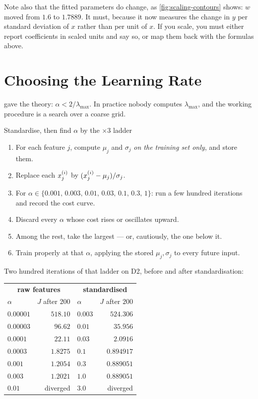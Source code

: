 Note also that the fitted parameters do change, as \cref{fig:scaling-contours}
shows: $w$ moved from $1.6$ to $1.7889$. It must, because it now measures the
change in $y$ per standard deviation of $x$ rather than per unit of $x$. If you
scale, you must either report coefficients in scaled units and say so, or map
them back with the formulas above.

\section{Choosing the Learning Rate}
\label{sec:alpha-ladder}

 gave the theory: $\alpha < 2/\lambda_{\max}$. In
practice nobody computes $\lambda_{\max}$, and the working procedure is a
search over a coarse grid.

\begin{algorithmbox}{Standardise, then find $\alpha$ by the $\times 3$ ladder}
\begin{enumerate}\setlength{\itemsep}{1pt}
  \item For each feature $j$, compute $\mu_j$ and $\sigma_j$ \emph{on the
        training set only}, and store them.
  \item Replace each $x^{(i)}_{j}$ by $(x^{(i)}_{j}-\mu_j)/\sigma_j$.
  \item For $\alpha \in \{0.001,\,0.003,\,0.01,\,0.03,\,0.1,\,0.3,\,1\}$: run a
        few hundred iterations and record the cost curve.
  \item Discard every $\alpha$ whose cost rises or oscillates upward.
  \item Among the rest, take the largest --- or, cautiously, the one below it.
  \item Train properly at that $\alpha$, applying the stored $\mu_j,\sigma_j$ to
        every future input.
\end{enumerate}
\end{algorithmbox}

Two hundred iterations of that ladder on D2, before and after standardisation:

\begin{center}
\small
\renewcommand{\arraystretch}{1.15}
\begin{tabular}{@{}lr@{\qquad}lr@{}}
\toprule
\multicolumn{2}{c}{\textbf{raw features}} &
\multicolumn{2}{c}{\textbf{standardised}}\\
$\alpha$ & $J$ after $200$ & $\alpha$ & $J$ after $200$\\
\midrule
$0.00001$ & $518.10$   & $0.003$ & $524.306$\\
$0.00003$ & $96.62$    & $0.01$  & $35.956$\\
$0.0001$  & $22.11$    & $0.03$  & $2.0916$\\
$0.0003$  & $1.8275$   & $0.1$   & $0.894917$\\
$0.001$   & $1.2054$   & $0.3$   & $\mathbf{0.889051}$\\
$0.003$   & $1.2021$   & $1.0$   & $\mathbf{0.889051}$\\
$0.01$    & diverged   & $3.0$   & diverged\\
\bottomrule
\end{tabular}
\end{center}

